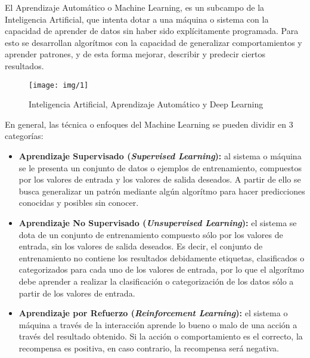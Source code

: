 El Aprendizaje Automático o Machine Learning, es un subcampo de la Inteligencia Artificial,
que intenta dotar a una máquina o sistema con la capacidad de aprender de datos sin
haber sido explícitamente programada. Para esto se desarrollan
algorítmos con la capacidad de generalizar comportamientos
y aprender patrones, y de esta forma mejorar, describir y predecir ciertos resultados.

\begin{figure}[h]
    \texttt{[image: img/1]}
    \centering
    \caption{Inteligencia Artificial, Aprendizaje Automático y Deep Learning \cite{cholletDeepLearningPython2018a}}
    \label{1}
\end{figure}

En general, las técnica o enfoques del Machine Learning se pueden dividir en 3
categorías:
\begin{itemize}
  \item \textbf{Aprendizaje Supervisado (\emph{Supervised Learning}):} al sistema o máquina se le presenta
  un conjunto de datos o ejemplos de entrenamiento, compuestos por los valores de entrada
  y los valores de salida deseados. A partir de ello se busca generalizar un patrón
  mediante algún algorítmo para hacer predicciones conocidas y posibles sin conocer.

  \item \textbf{Aprendizaje No Supervisado (\emph{Unsupervised Learning}):} el sistema se dota
  de un conjunto de entrenamiento compuesto sólo por los valores de entrada, sin los valores de
  salida deseados. Es decir, el conjunto de entrenamiento no contiene los resultados
  debidamente etiquetas, clasificados o categorizados para cada uno de los valores de entrada,
  por lo que el algorítmo debe aprender a realizar la clasificación o categorización
  de los datos sólo a partir de los valores de entrada.

  \item \textbf{Aprendizaje por Refuerzo (\emph{Reinforcement Learning}):} el sistema
  o máquina a través de la interacción aprende lo bueno o malo de una acción a través
  del resultado obtenido. Si la acción o comportamiento es el correcto, la recompensa
  es positiva, en caso contrario, la recompensa será negativa.
\end{itemize}


